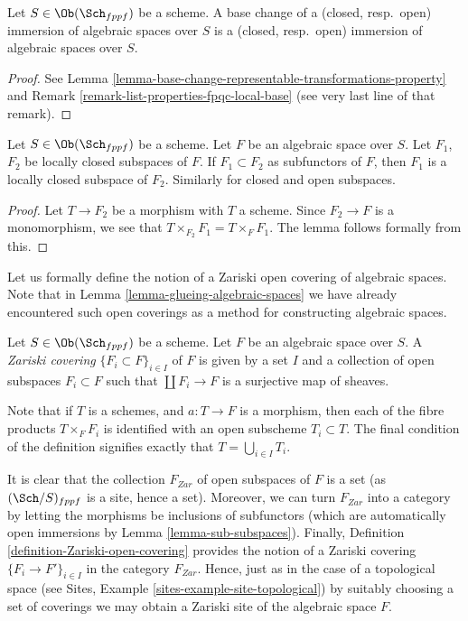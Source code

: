 \begin{lemma}
\label{lemma-base-change-immersions}
Let $S \in \Ob(\Sch_{fppf})$ be a scheme.
A base change of a (closed, resp.\ open) immersion
of algebraic spaces over $S$ is a (closed, resp.\ open)
immersion of algebraic spaces over $S$.
\end{lemma}

\begin{proof}
See Lemma \ref{lemma-base-change-representable-transformations-property} and
Remark \ref{remark-list-properties-fpqc-local-base} (see very last line of
that remark).
\end{proof}

\begin{lemma}
\label{lemma-sub-subspaces}
Let $S \in \Ob(\Sch_{fppf})$ be a scheme.
Let $F$ be an algebraic space over $S$. Let $F_1$, $F_2$ be
locally closed subspaces of $F$. If $F_1 \subset F_2$ as subfunctors
of $F$, then $F_1$ is a locally closed subspace of $F_2$.
Similarly for closed and open subspaces.
\end{lemma}

\begin{proof}
Let $T \to F_2$ be a morphism with $T$ a scheme.
Since $F_2 \to F$ is a monomorphism, we see that
$T \times_{F_2} F_1 = T \times_F F_1$. The lemma follows
formally from this.
\end{proof}

\noindent
Let us formally define the notion of a Zariski open covering of
algebraic spaces. Note that in Lemma \ref{lemma-glueing-algebraic-spaces}
we have already encountered such open coverings as a method for
constructing algebraic spaces.

\begin{definition}
\label{definition-Zariski-open-covering}
Let $S \in \Ob(\Sch_{fppf})$ be a scheme.
Let $F$ be an algebraic space over $S$.
A {\it Zariski covering} $\{F_i \subset F\}_{i \in I}$ of $F$
is given by a set $I$ and a collection of open subspaces
$F_i \subset F$ such that $\coprod F_i \to F$ is a surjective
map of sheaves.
\end{definition}

\noindent
Note that if $T$ is a schemes,
and $a : T \to F$ is a morphism, then each of the fibre products
$T \times_F F_i$ is identified with an open subscheme
$T_i \subset T$. The final condition of the definition signifies
exactly that $T = \bigcup_{i \in I} T_i$.

\medskip\noindent
It is clear that the collection $F_{Zar}$ of open subspaces of
$F$ is a set (as $(\Sch/S)_{fppf}$ is a site, hence a set).
Moreover, we can turn $F_{Zar}$ into a category by letting the
morphisms be inclusions of subfunctors (which are automatically open
immersions by Lemma \ref{lemma-sub-subspaces}). Finally,
Definition \ref{definition-Zariski-open-covering}
provides the notion of a Zariski covering $\{F_i \to F'\}_{i \in I}$
in the category $F_{Zar}$. Hence, just as in the case of a topological
space (see Sites, Example \ref{sites-example-site-topological})
by suitably choosing a set of coverings
we may obtain a Zariski site of the algebraic space $F$.


